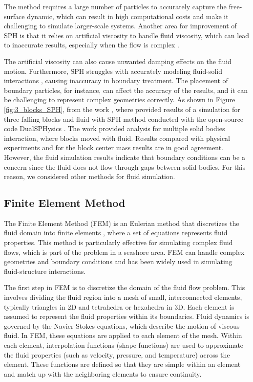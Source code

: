 The method requires a large number of particles to accurately capture the free-surface dynamic, which can result in high computational costs and make it challenging to simulate larger-scale systems. Another area for improvement of SPH is that it relies on artificial viscosity to handle fluid viscosity, which can lead to inaccurate results, especially when the flow is complex \cite{zhang2018dualsphysics}. 

The artificial viscosity can also cause unwanted damping effects on the fluid motion. Furthermore, SPH struggles with accurately modeling fluid-solid interactions \cite{Dual_SPH2019accuracy}, causing inaccuracy in boundary treatment. The placement of boundary particles, for instance, can affect the accuracy of the results, and it can be challenging to represent complex geometries correctly. As shown in Figure \ref{fig:3_blocks_SPH}, from the work \cite{sarmakeeva2017meshfree}, where provided results of a simulation for three falling blocks and fluid with SPH method conducted with the open-source code DualSPHysics \cite{Dual_SPH2019accuracy}. The work provided analysis for multiple solid bodies interaction, where blocks moved with fluid. Results compared with physical experiments and for the block center mass results are in good agreement. However, the fluid simulation results indicate that boundary conditions can be a concern since the fluid does not flow through gaps between solid bodies. For this reason, we considered other methods for fluid simulation.

\subsection{Finite Element Method}
The Finite Element Method (FEM) is an Eulerian method that discretizes the fluid domain into finite elements \cite{FEM}, where a set of equations represents fluid properties. This method is particularly effective for simulating complex fluid flows, which is part of the problem in a seashore area. FEM can handle complex geometries and boundary conditions and has been widely used in simulating fluid-structure interactions.

The first step in FEM is to discretize the domain of the fluid flow problem. This involves dividing the fluid region into a mesh of small, interconnected elements, typically triangles in 2D and tetrahedra or hexahedra in 3D. Each element is assumed to represent the fluid properties within its boundaries. Fluid dynamics is governed by the Navier-Stokes equations, which describe the motion of viscous fluid. In FEM, these equations are applied to each element of the mesh. Within each element, interpolation functions (shape functions) are used to approximate the fluid properties (such as velocity, pressure, and temperature) across the element. These functions are defined so that they are simple within an element and match up with the neighboring elements to ensure continuity. 

